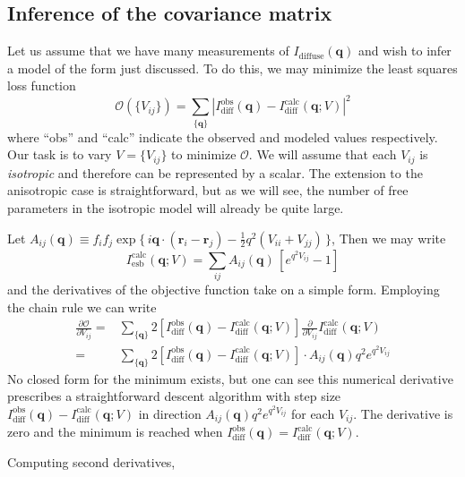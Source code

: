 \documentclass{article}
\begin{document}
\subsection{Inference of the covariance matrix}

Let us assume that we have many measurements of $I_\mathrm{diffuse}(\mathbf{q})$ and wish to infer a model of the form just discussed. To do this, we may minimize the least squares loss function
\[
\mathcal{O} ( \{ V_{ij} \} )= \sum_{\{\mathbf{q}\}} \left| I_\mathrm{diff}^\mathrm{obs} (\mathbf{q}) 
- I_\mathrm{diff}^\mathrm{calc} (\mathbf{q}; V) \right|^2
\]
where ``obs'' and ``calc'' indicate the observed and modeled values respectively. Our task is to vary $ V = \{ V_{ij} \}$ to minimize $\mathcal{O}$. We will assume that each $V_{ij}$ is \emph{isotropic} and therefore can be represented by a scalar. The extension to the anisotropic case is straightforward, but as we will see, the number of free parameters in the isotropic model will already be quite large.

Let $A_{ij} (\mathbf{q}) \equiv f_{i} f_{j} \exp \{ \, i \mathbf{q} \cdot (\mathbf{r}_{i}- \mathbf{r}_{j}) - \frac{1}{2} q^2(V_{ii} + V_{jj} ) \, \}$, Then we may write
\[
I_\mathrm{esb}^\mathrm{calc} (\mathbf{q}; V) = \sum_{ij} A_{ij} (\mathbf{q}) \, 
\left[ e^{q^2 V_{ij}} - 1 \right]
\]
and the derivatives of the objective function take on a simple form. Employing the chain rule we can write
\begin{align}
\frac{\partial \mathcal{O}} {\partial V_{ij}} =& 
\sum_{\{\mathbf{q}\}} 2 
\left[ I_\mathrm{diff}^\mathrm{obs} (\mathbf{q}) - 
I_\mathrm{diff}^\mathrm{calc} (\mathbf{q}; V) \right]
\frac{\partial} {\partial V_{ij}} I_\mathrm{diff}^\mathrm{calc} (\mathbf{q}; V) \\
%
=& 
\sum_{\{\mathbf{q}\}} 2 
\left[ I_\mathrm{diff}^\mathrm{obs} (\mathbf{q}) - 
I_\mathrm{diff}^\mathrm{calc} (\mathbf{q}; V) \right] \cdot A_{ij}(\mathbf{q}) q^2 e^{q^2 V_{ij}}
\end{align}
No closed form for the minimum exists, but one can see this numerical derivative prescribes a straightforward descent algorithm with step size $I_\mathrm{diff}^\mathrm{obs} (\mathbf{q}) - I_\mathrm{diff}^\mathrm{calc} (\mathbf{q}; V)$ in direction $A_{ij}(\mathbf{q}) q^2 e^{q^2 V_{ij}}$ for each $V_{ij}$. The derivative is zero and the minimum is reached when $I_\mathrm{diff}^\mathrm{obs} (\mathbf{q}) = I_\mathrm{diff}^\mathrm{calc} (\mathbf{q}; V)$.

Computing second derivatives, 
\end{document}
